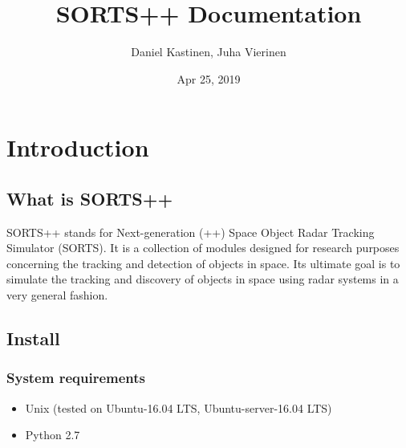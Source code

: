 \documentclass[letterpaper,10pt,english]{sphinxmanual}
\title{SORTS++ Documentation}
\date{Apr 25, 2019}
\author{Daniel Kastinen, Juha Vierinen}
\begin{document}
\pagestyle{empty}
\maketitle
\pagestyle{plain}
\sphinxtableofcontents
\pagestyle{normal}
\label{\detokenize{index::doc}}



\chapter{Introduction}
\label{\detokenize{introduction/introduction:introduction}}\label{\detokenize{introduction/introduction::doc}}

\section{What is SORTS++}
\label{\detokenize{introduction/introduction:what-is-sorts}}
SORTS++ stands for Next-generation (++) Space Object Radar Tracking Simulator (SORTS). It is a collection of modules designed for research purposes concerning the tracking and detection of objects in space. Its ultimate goal is to simulate the tracking and discovery of objects in space using radar systems in a very general fashion.


\section{Install}
\label{\detokenize{introduction/introduction:install}}

\subsection{System requirements}
\label{\detokenize{introduction/introduction:system-requirements}}\begin{itemize}
\item {} 
Unix (tested on Ubuntu-16.04 LTS, Ubuntu-server-16.04 LTS)

\item {} 
Python 2.7

\end{itemize}
\end{document}
